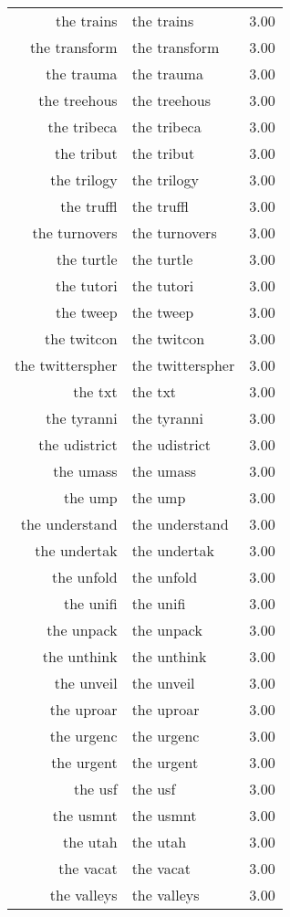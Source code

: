 \begin{table}[ht]
\begin{tabular}{rlr}
  the trains & the trains & 3.00 \\ 
  the transform & the transform & 3.00 \\ 
  the trauma & the trauma & 3.00 \\ 
  the treehous & the treehous & 3.00 \\ 
  the tribeca & the tribeca & 3.00 \\ 
  the tribut & the tribut & 3.00 \\ 
  the trilogy & the trilogy & 3.00 \\ 
  the truffl & the truffl & 3.00 \\ 
  the turnovers & the turnovers & 3.00 \\ 
  the turtle & the turtle & 3.00 \\ 
  the tutori & the tutori & 3.00 \\ 
  the tweep & the tweep & 3.00 \\ 
  the twitcon & the twitcon & 3.00 \\ 
  the twitterspher & the twitterspher & 3.00 \\ 
  the txt & the txt & 3.00 \\ 
  the tyranni & the tyranni & 3.00 \\ 
  the udistrict & the udistrict & 3.00 \\ 
  the umass & the umass & 3.00 \\ 
  the ump & the ump & 3.00 \\ 
  the understand & the understand & 3.00 \\ 
  the undertak & the undertak & 3.00 \\ 
  the unfold & the unfold & 3.00 \\ 
  the unifi & the unifi & 3.00 \\ 
  the unpack & the unpack & 3.00 \\ 
  the unthink & the unthink & 3.00 \\ 
  the unveil & the unveil & 3.00 \\ 
  the uproar & the uproar & 3.00 \\ 
  the urgenc & the urgenc & 3.00 \\ 
  the urgent & the urgent & 3.00 \\ 
  the usf & the usf & 3.00 \\ 
  the usmnt & the usmnt & 3.00 \\ 
  the utah & the utah & 3.00 \\ 
  the vacat & the vacat & 3.00 \\ 
  the valleys & the valleys & 3.00 \\ 

\end{tabular}
\end{table}
